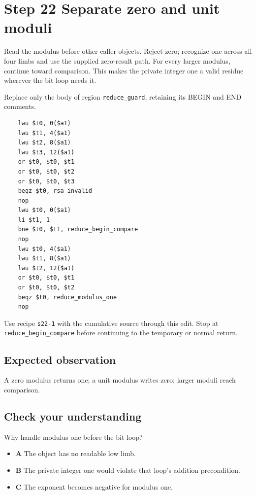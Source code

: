 \section{Step 22 Separate zero and unit moduli}\label{rsa-s22}

Read the modulus before other caller objects. Reject zero; recognize one across all four limbs and use the supplied zero-result path. For every larger modulus, continue toward comparison. This makes the private integer one a valid residue wherever the bit loop needs it.

Replace only the body of region \texttt{reduce\_guard}, retaining its BEGIN and END comments.

\begin{verbatim}
    lwu $t0, 0($a1)
    lwu $t1, 4($a1)
    lwu $t2, 8($a1)
    lwu $t3, 12($a1)
    or $t0, $t0, $t1
    or $t0, $t0, $t2
    or $t0, $t0, $t3
    beqz $t0, rsa_invalid
    nop
    lwu $t0, 0($a1)
    li $t1, 1
    bne $t0, $t1, reduce_begin_compare
    nop
    lwu $t0, 4($a1)
    lwu $t1, 8($a1)
    lwu $t2, 12($a1)
    or $t0, $t0, $t1
    or $t0, $t0, $t2
    beqz $t0, reduce_modulus_one
    nop
\end{verbatim}

Use recipe \texttt{s22-1} with the cumulative source through this edit. Stop at \texttt{reduce\_begin\_compare} before continuing to the temporary or normal return.

\subsection{Expected observation}
A zero modulus returns one; a unit modulus writes zero; larger moduli reach comparison.

\subsection{Check your understanding}
Why handle modulus one before the bit loop?

\begin{itemize}
\item \textbf{A} The object has no readable low limb.
\item \textbf{B} The private integer one would violate that loop's addition precondition.
\item \textbf{C} The exponent becomes negative for modulus one.
\end{itemize}
